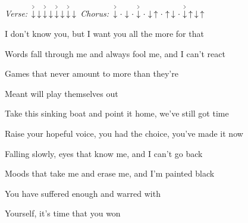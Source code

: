 \begin{song}


\begin{headerbox}
\RaiseBoxWithAccents
\textit{Verse:} $\AccentDown\Down\AccentDown\Down\AccentDown\Down\AccentDown\Down$ \quad
\textit{Chorus:} $\AccentDown\Miss\Down\Miss\AccentDown\Miss\Down\Up\Miss\Up\Down\Miss\AccentDown\Up\Down\Up$
\end{headerbox}

\begin{hchordbox}
\end{hchordbox}

\large

\bigskip

\Intro {}    \par

\bigskip

I don't know you, but I want you all the more for that \par
{}Words fall through me and always fool me, and I can't react \par

\bigskip

Games that never amount to more than they're \par
{}Meant will play themselves out \par
{} \par

\bigskip

Take this sinking boat and point it home, we've still got time \par
{}Raise your hopeful voice, you had the choice, you've made it now \par
{} \par

\bigskip

Falling slowly, eyes that know me, and I can't go back \par
{}Moods that take me and erase me, and I'm painted black \par

\bigskip

You have suffered enough and warred with \par
Yourself, it's time that you won \par
{} \par


\end{song}
